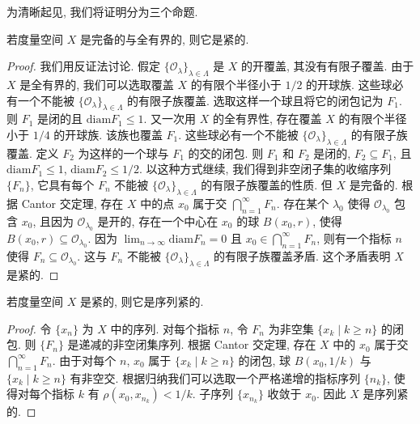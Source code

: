 \documentclass[../../main.tex]{subfiles}
\begin{document}
为清晰起见, 我们将证明分为三个命题.

\begin{proposition}\label{proposition:ch09-完备全有界紧}
若度量空间 $X$ 是完备的与全有界的, 则它是紧的.
\end{proposition}

\begin{proof}
我们用反证法讨论. 假定 $\{\mathcal{O}_{\lambda}\}_{\lambda\in\Lambda}$ 是 $X$ 的开覆盖, 其没有有限子覆盖. 由于 $X$ 是全有界的, 我们可以选取覆盖 $X$ 的有限个半径小于 $1/2$ 的开球族. 这些球必有一个不能被 $\{\mathcal{O}_{\lambda}\}_{\lambda\in\Lambda}$ 的有限子族覆盖. 选取这样一个球且将它的闭包记为 $F_{1}$. 则 $F_{1}$ 是闭的且 $\mathrm{diam}F_{1}\leqslant 1$. 又一次用 $X$ 的全有界性, 存在覆盖 $X$ 的有限个半径小于 $1/4$ 的开球族. 该族也覆盖 $F_{1}$. 这些球必有一个不能被 $\{\mathcal{O}_{\lambda}\}_{\lambda\in\Lambda}$ 的有限子族覆盖. 定义 $F_{2}$ 为这样的一个球与 $F_{1}$ 的交的闭包. 则 $F_{1}$ 和 $F_{2}$ 是闭的, $F_{2}\subseteq F_{1}$, 且 $\mathrm{diam}F_{1}\leqslant 1$, $\mathrm{diam}F_{2}\leqslant 1/2$. 以这种方式继续, 我们得到非空闭子集的收缩序列 $\{F_{n}\}$, 它具有每个 $F_{n}$ 不能被 $\{\mathcal{O}_{\lambda}\}_{\lambda\in\Lambda}$ 的有限子族覆盖的性质. 但 $X$ 是完备的. 根据 Cantor 交定理, 存在 $X$ 中的点 $x_{0}$ 属于交 $\bigcap_{n=1}^{\infty}F_{n}$. 存在某个 $\lambda_{0}$ 使得 $\mathcal{O}_{\lambda_{0}}$ 包含 $x_{0}$, 且因为 $\mathcal{O}_{\lambda_{0}}$ 是开的, 存在一个中心在 $x_{0}$ 的球 $B(x_{0},r)$, 使得 $B(x_{0},r)\subseteq\mathcal{O}_{\lambda_{0}}$. 因为 $\lim_{n\to\infty}\mathrm{diam}F_{n}=0$ 且 $x_{0}\in\bigcap_{n=1}^{\infty}F_{n}$, 则有一个指标 $n$ 使得 $F_{n}\subseteq\mathcal{O}_{\lambda_{0}}$. 这与 $F_{n}$ 不能被 $\{\mathcal{O}_{\lambda}\}_{\lambda\in\Lambda}$ 的有限子族覆盖矛盾. 这个矛盾表明 $X$ 是紧的.
\end{proof}

\begin{proposition}\label{proposition:ch09-紧序列紧}
若度量空间 $X$ 是紧的, 则它是序列紧的.
\end{proposition}

\begin{proof}
令 $\{x_{n}\}$ 为 $X$ 中的序列. 对每个指标 $n$, 令 $F_{n}$ 为非空集 $\{x_{k}\mid k\geqslant n\}$ 的闭包. 则 $\{F_{n}\}$ 是递减的非空闭集序列. 根据 Cantor 交定理, 存在 $X$ 中的 $x_{0}$ 属于交 $\bigcap_{n=1}^{\infty}F_{n}$. 由于对每个 $n$, $x_{0}$ 属于 $\{x_{k}\mid k\geqslant n\}$ 的闭包, 球 $B(x_{0},1/k)$ 与 $\{x_{k}\mid k\geqslant n\}$ 有非空交. 根据归纳我们可以选取一个严格递增的指标序列 $\{n_{k}\}$, 使得对每个指标 $k$ 有 $\rho(x_{0},x_{n_{k}})<1/k$. 子序列 $\{x_{n_{k}}\}$ 收敛于 $x_{0}$. 因此 $X$ 是序列紧的.
\end{proof}
\end{document}
